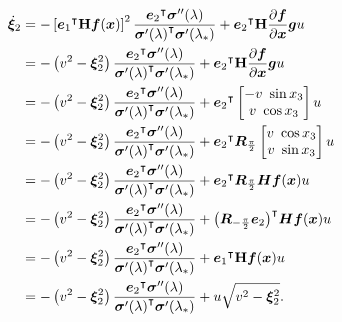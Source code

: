 \begin{align*}
    \dot{\bm{\xi}}_2 &=
                    -\left[{\bm{e}_1}^{\intercal}\mathbf{H}\bm{f}(\bm{x})\right]^2  \frac{{\bm{e}_2}^{\intercal}\bm{\sigma}''(\lambda)}{{\bm{\sigma}'(\lambda)}^{\intercal}\bm{\sigma}'(\lambda_*)}
                    +
                    {\bm{e}_2}^{\intercal}\mathbf{H}\frac{\partial\bm{f}}{\partial\bm{x}}\bm{g} u\\
                &=
                    -\left(v^2 - \bm{\xi}_2^2\right) \frac{{\bm{e}_2}^{\intercal}\bm{\sigma}''(\lambda)}{{\bm{\sigma}'(\lambda)}^{\intercal}\bm{\sigma}'(\lambda_*)}
                    +
                    {\bm{e}_2}^{\intercal}\mathbf{H}\frac{\partial\bm{f}}{\partial\bm{x}}\bm{g} u\\
                &=
                    -\left(v^2 - \bm{\xi}_2^2\right) \frac{{\bm{e}_2}^{\intercal}\bm{\sigma}''(\lambda)}{{\bm{\sigma}'(\lambda)}^{\intercal}\bm{\sigma}'(\lambda_*)}
                    +
                    {\bm{e}_2}^{\intercal}
                        \begin{bmatrix}
                            -v~\sin x_3 \\
                            v~\cos x_3
                        \end{bmatrix}
                    u\\
                &=
                    -\left(v^2 - \bm{\xi}_2^2\right) \frac{{\bm{e}_2}^{\intercal}\bm{\sigma}''(\lambda)}{{\bm{\sigma}'(\lambda)}^{\intercal}\bm{\sigma}'(\lambda_*)}
                    +
                    {\bm{e}_2}^{\intercal}\bm{R}_{\frac{\pi}{2}}
                        \begin{bmatrix}
                            v~\cos x_3 \\
                            v~\sin x_3
                        \end{bmatrix}
                    u\\
                &=
                    -\left(v^2 - \bm{\xi}_2^2\right) \frac{{\bm{e}_2}^{\intercal}\bm{\sigma}''(\lambda)}{{\bm{\sigma}'(\lambda)}^{\intercal}\bm{\sigma}'(\lambda_*)}
                    +
                    {\bm{e}_2}^{\intercal}\bm{R}_{\frac{\pi}{2}}\bm{H}\bm{f}(\bm{x}) u\\
                &=
                    -\left(v^2 - \bm{\xi}_2^2\right) \frac{{\bm{e}_2}^{\intercal}\bm{\sigma}''(\lambda)}{{\bm{\sigma}'(\lambda)}^{\intercal}\bm{\sigma}'(\lambda_*)}
                    +
                    {\left(\bm{R}_{-\frac{\pi}{2}}\bm{e}_2\right)}^{\intercal}\bm{H}\bm{f}(\bm{x}) u\\
                &=
                    -\left(v^2 - \bm{\xi}_2^2\right) \frac{{\bm{e}_2}^{\intercal}\bm{\sigma}''(\lambda)}{{\bm{\sigma}'(\lambda)}^{\intercal}\bm{\sigma}'(\lambda_*)}
                    +
                    {\bm{e}_1}^{\intercal}\mathbf{H}\bm{f}(\bm{x}) u\\
                &=
                    -\left(v^2 - \bm{\xi}_2^2\right) \frac{{\bm{e}_2}^{\intercal}\bm{\sigma}''(\lambda)}{{\bm{\sigma}'(\lambda)}^{\intercal}\bm{\sigma}'(\lambda_*)}
                    +
                    u \sqrt{v^2 - \bm{\xi}_2^2}.\\
\end{align*}
